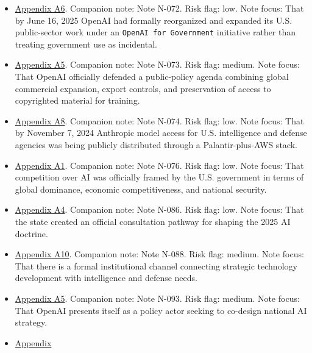 \documentclass[
  american,
  11pt,
  letterpaper,
]{article}
\begin{document}
\begin{itemize}
  moved into an official federal consultation process.
\item
  \hyperref[ch-07-appendix-a6-introducing-openai-for-government]{Appendix
  A6}. Companion note: Note N-072. Risk flag: low. Note focus: That by
  June 16, 2025 OpenAI had formally reorganized and expanded its U.S.
  public-sector work under an \texttt{OpenAI\ for\ Government}
  initiative rather than treating government use as incidental.
\item
  \hyperref[ch-07-appendix-a5-openais-proposals-for-the-us-ai-action-plan]{Appendix
  A5}. Companion note: Note N-073. Risk flag: medium. Note focus: That
  OpenAI officially defended a public-policy agenda combining global
  commercial expansion, export controls, and preservation of access to
  copyrighted material for training.
\item
  \hyperref[ch-07-appendix-a8-anthropic-and-palantir-partner-to-bring-claude-ai-models-to-aws-for-u-s-government-intelligence-and-defense-operations]{Appendix
  A8}. Companion note: Note N-074. Risk flag: low. Note focus: That by
  November 7, 2024 Anthropic model access for U.S. intelligence and
  defense agencies was being publicly distributed through a
  Palantir-plus-AWS stack.
\item
  \hyperref[ch-07-appendix-a1-removing-barriers-to-american-leadership-in-artificial-intelligence]{Appendix
  A1}. Companion note: Note N-076. Risk flag: low. Note focus: That
  competition over AI was officially framed by the U.S. government in
  terms of global dominance, economic competitiveness, and national
  security.
\item
  \hyperref[ch-07-appendix-a4-request-for-information-on-the-development-of-an-artificial-intelligence-ai-action-plan]{Appendix
  A4}. Companion note: Note N-086. Risk flag: low. Note focus: That the
  state created an official consultation pathway for shaping the 2025 AI
  doctrine.
\item
  \hyperref[ch-07-appendix-a10-in-q-tel]{Appendix A10}. Companion note:
  Note N-088. Risk flag: medium. Note focus: That there is a formal
  institutional channel connecting strategic technology development with
  intelligence and defense needs.
\item
  \hyperref[ch-07-appendix-a5-openais-proposals-for-the-us-ai-action-plan]{Appendix
  A5}. Companion note: Note N-093. Risk flag: medium. Note focus: That
  OpenAI presents itself as a policy actor seeking to co-design national
  AI strategy.
\item
  \hyperref[ch-07-appendix-a1-removing-barriers-to-american-leadership-in-artificial-intelligence]{Appendix
}
\end{itemize}
\end{document}
